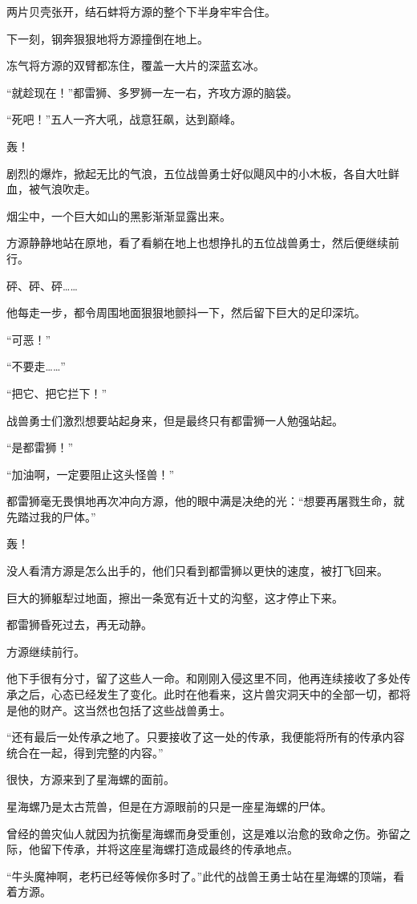 \begin{this_body}
两片贝壳张开，结石蚌将方源的整个下半身牢牢合住。

下一刻，钢奔狠狠地将方源撞倒在地上。

冻气将方源的双臂都冻住，覆盖一大片的深蓝玄冰。

“就趁现在！”都雷狮、多罗狮一左一右，齐攻方源的脑袋。

“死吧！”五人一齐大吼，战意狂飙，达到巅峰。

轰！

剧烈的爆炸，掀起无比的气浪，五位战兽勇士好似飓风中的小木板，各自大吐鲜血，被气浪吹走。

烟尘中，一个巨大如山的黑影渐渐显露出来。

方源静静地站在原地，看了看躺在地上也想挣扎的五位战兽勇士，然后便继续前行。

砰、砰、砰……

他每走一步，都令周围地面狠狠地颤抖一下，然后留下巨大的足印深坑。

“可恶！”

“不要走……”

“把它、把它拦下！”

战兽勇士们激烈想要站起身来，但是最终只有都雷狮一人勉强站起。

“是都雷狮！”

“加油啊，一定要阻止这头怪兽！”

都雷狮毫无畏惧地再次冲向方源，他的眼中满是决绝的光：“想要再屠戮生命，就先踏过我的尸体。”

轰！

没人看清方源是怎么出手的，他们只看到都雷狮以更快的速度，被打飞回来。

巨大的狮躯犁过地面，擦出一条宽有近十丈的沟壑，这才停止下来。

都雷狮昏死过去，再无动静。

方源继续前行。

他下手很有分寸，留了这些人一命。和刚刚入侵这里不同，他再连续接收了多处传承之后，心态已经发生了变化。此时在他看来，这片兽灾洞天中的全部一切，都将是他的财产。这当然也包括了这些战兽勇士。

“还有最后一处传承之地了。只要接收了这一处的传承，我便能将所有的传承内容统合在一起，得到完整的内容。”

很快，方源来到了星海螺的面前。

星海螺乃是太古荒兽，但是在方源眼前的只是一座星海螺的尸体。

曾经的兽灾仙人就因为抗衡星海螺而身受重创，这是难以治愈的致命之伤。弥留之际，他留下传承，并将这座星海螺打造成最终的传承地点。

“牛头魔神啊，老朽已经等候你多时了。”此代的战兽王勇士站在星海螺的顶端，看着方源。


\end{this_body}
